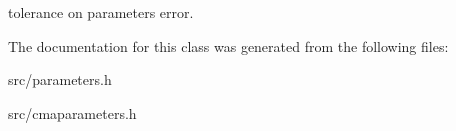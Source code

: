 tolerance on parameters error. 

The documentation for this class was generated from the following files\-:\begin{DoxyCompactItemize}
\item 
src/parameters.\-h\item 
src/cmaparameters.\-h\end{DoxyCompactItemize}
